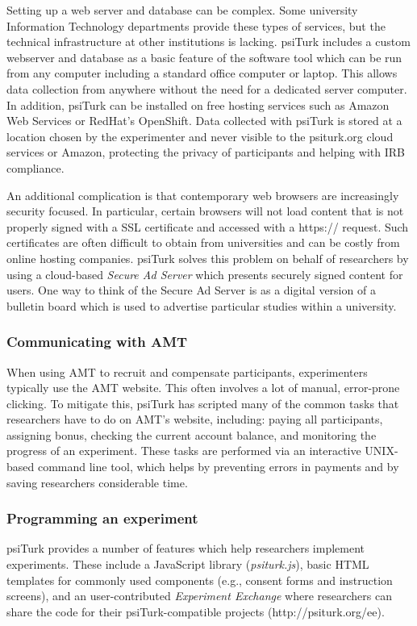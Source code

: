 \documentclass[twocolumn]{svjour3}          %
\newcommand{\psiturk}[0]{\textsf{psiTurk}}
\newcommand{\psiturkjs}[0]{\emph{psiturk.js}}
\begin{document}
Setting up a web server and database can be complex.  Some university Information
Technology departments
provide these types of services, but the technical infrastructure at other 
institutions is lacking.  \psiturk{} includes a custom webserver and database
as a basic feature of the software tool which can be run from any computer
including a standard office computer or laptop.  This allows data collection from
anywhere without the need for a dedicated server computer.  In addition, \psiturk{}
can be installed on free hosting services such as Amazon Web Services
or RedHat's OpenShift.  Data collected with \psiturk{} is stored at a location
chosen by the experimenter and never visible to the \textsf{psiturk.org} cloud
services or Amazon, protecting the privacy of participants and helping with IRB compliance.

An additional complication is that contemporary web browsers are increasingly security
focused.  In particular, certain browsers will not load content that is not properly 
signed with a SSL certificate and accessed with a \textsf{https://} request.  Such certificates
are often difficult to obtain from universities and can be costly from online
hosting companies.  \psiturk{} solves this problem on behalf of researchers by
using a cloud-based \emph{Secure Ad Server} which presents securely signed
content for users.  One way to think of the Secure Ad Server is as a digital
version of a bulletin board which is used to advertise particular
studies within a university.


\subsubsection{Communicating with AMT}

When using AMT to recruit and compensate participants,
experimenters typically use the AMT website.  This often
involves a lot of manual, error-prone clicking.  To mitigate this, \psiturk{}
has scripted many of the common
tasks that researchers have to do on AMT's website, including:
paying all participants, assigning bonus, checking the current
account balance, and monitoring the progress of an experiment.
These tasks are performed via an interactive UNIX-based command
line tool, which helps by preventing errors in payments and
by saving researchers considerable time.

\subsubsection{Programming an experiment}
\psiturk{} provides a number of features which help researchers implement 
experiments.  These include a JavaScript library (\psiturkjs{}), basic HTML templates 
for commonly used components (e.g., consent forms and instruction screens), 
and an user-contributed \emph{Experiment Exchange} where researchers can share the code for their \psiturk{}-compatible
projects (\textsf{http://psiturk.org/ee}). 
\end{document}
